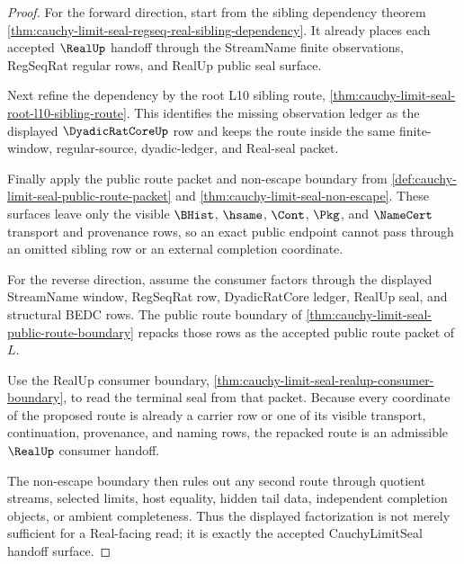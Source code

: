 \begin{proof}
For the forward direction, start from the sibling dependency theorem \autoref{thm:cauchy-limit-seal-regseq-real-sibling-dependency}. It already places each accepted $\RealUp$ handoff through the StreamName finite observations, RegSeqRat regular rows, and RealUp public seal surface.

Next refine the dependency by the root L10 sibling route, \autoref{thm:cauchy-limit-seal-root-l10-sibling-route}. This identifies the missing observation ledger as the displayed $\DyadicRatCoreUp$ row and keeps the route inside the same finite-window, regular-source, dyadic-ledger, and Real-seal packet.

Finally apply the public route packet and non-escape boundary from \autoref{def:cauchy-limit-seal-public-route-packet} and \autoref{thm:cauchy-limit-seal-non-escape}. These surfaces leave only the visible $\BHist$, $\hsame$, $\Cont$, $\Pkg$, and $\NameCert$ transport and provenance rows, so an exact public endpoint cannot pass through an omitted sibling row or an external completion coordinate.

For the reverse direction, assume the consumer factors through the displayed StreamName window, RegSeqRat row, DyadicRatCore ledger, RealUp seal, and structural BEDC rows. The public route boundary of \autoref{thm:cauchy-limit-seal-public-route-boundary} repacks those rows as the accepted public route packet of $L$.

Use the RealUp consumer boundary, \autoref{thm:cauchy-limit-seal-realup-consumer-boundary}, to read the terminal seal from that packet. Because every coordinate of the proposed route is already a carrier row or one of its visible transport, continuation, provenance, and naming rows, the repacked route is an admissible $\RealUp$ consumer handoff.

The non-escape boundary then rules out any second route through quotient streams, selected limits, host equality, hidden tail data, independent completion objects, or ambient completeness. Thus the displayed factorization is not merely sufficient for a Real-facing read; it is exactly the accepted CauchyLimitSeal handoff surface.
\end{proof}

